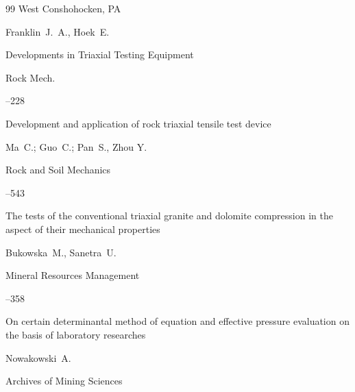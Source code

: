 \begin{thebibliography}{99}
\publaddr West Conshohocken, PA








\by  Franklin~J.~A., Hoek~E. 

\paper Developments in Triaxial Testing Equipment

\jour  Rock Mech.



--228





\paper Development and application of rock triaxial tensile test device

\by Ma~C.; Guo~C.; Pan~S., Zhou Y.

\jour Rock and Soil Mechanics



--543   





\paper  The tests of the conventional triaxial granite and dolomite compression in the aspect of their mechanical properties

\by Bukowska~M., Sanetra~U.

\jour Mineral Resources Management



--358   






\paper  On certain determinantal method of equation and effective pressure evaluation on the basis of laboratory researches

\by Nowakowski~A.

\jour Archives of Mining Sciences




\end{thebibliography}
